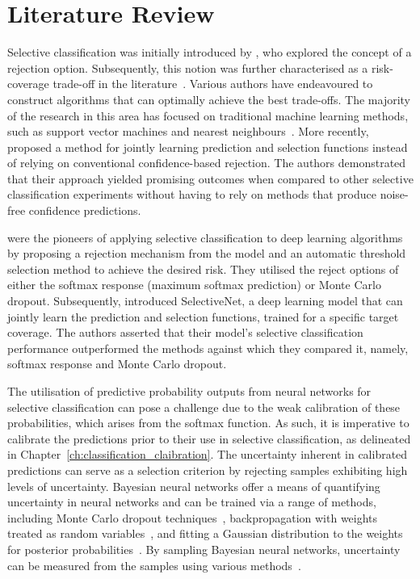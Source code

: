 \section{Literature Review}
\label{sec:selective_review}
Selective classification was initially introduced by \cite{chow1957optimum}, who explored the concept of a rejection option. Subsequently, this notion was further characterised as a risk-coverage trade-off in the literature~\citep{el2010foundations}. Various authors have endeavoured to construct algorithms that can optimally achieve the best trade-offs. The majority of the research in this area has focused on traditional machine learning methods, such as support vector machines and nearest neighbours~\citep{hellman1970nearest,fumera2002support,wiener2015agnostic}. More recently, \cite{cortes2016learning} proposed a method for jointly learning prediction and selection functions instead of relying on conventional confidence-based rejection. The authors demonstrated that their approach yielded promising outcomes when compared to other selective classification experiments without having to rely on methods that produce noise-free confidence predictions.

\cite{geifman2017selective} were the pioneers of applying selective classification to deep learning algorithms by proposing a rejection mechanism from the model and an automatic threshold selection method to achieve the desired risk. They utilised the reject options of either the softmax response (maximum softmax prediction) or Monte Carlo dropout. Subsequently, \cite{geifman2019selectivenet} introduced SelectiveNet, a deep learning model that can jointly learn the prediction and selection functions, trained for a specific target coverage. The authors asserted that their model's selective classification performance outperformed the methods against which they compared it, namely, softmax response and Monte Carlo dropout.

The utilisation of predictive probability outputs from neural networks for selective classification can pose a challenge due to the weak calibration of these probabilities, which arises from the softmax function. As such, it is imperative to calibrate the predictions prior to their use in selective classification, as delineated in Chapter~\ref{ch:classification_claibration}. The uncertainty inherent in calibrated predictions can serve as a selection criterion by rejecting samples exhibiting high levels of uncertainty. Bayesian neural networks offer a means of quantifying uncertainty in neural networks and can be trained via a range of methods, including Monte Carlo dropout techniques~\citep{gal2016dropout}, backpropagation with weights treated as random variables~\citep{blundell2015weight}, and fitting a Gaussian distribution to the weights for posterior probabilities~\citep{mackay1992bayesian}. By sampling Bayesian neural networks, uncertainty can be measured from the samples using various methods~\citep{gal2016uncertainty}.




